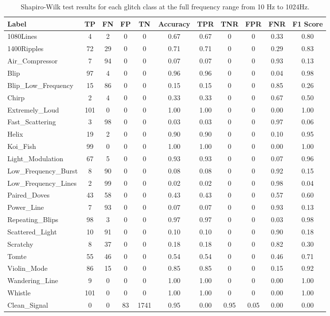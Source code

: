 \documentclass[12pt]{article}
\begin{document}
\begin{table}[H]
  \centering
  \begin{tabular}{lcccccccccc}
  \toprule
  Label & TP & FN & FP & TN & Accuracy & TPR & TNR & FPR & FNR & F1 Score \\
  \midrule
  1080Lines & 4 & 2 & 0 & 0 & 0.67 & 0.67 & 0 & 0 & 0.33 & 0.80 \\
  1400Ripples & 72 & 29 & 0 & 0 & 0.71 & 0.71 & 0 & 0 & 0.29 & 0.83 \\
  Air\_Compressor & 7 & 94 & 0 & 0 & 0.07 & 0.07 & 0 & 0 & 0.93 & 0.13 \\
  Blip & 97 & 4 & 0 & 0 & 0.96 & 0.96 & 0 & 0 & 0.04 & 0.98 \\
  Blip\_Low\_Frequency & 15 & 86 & 0 & 0 & 0.15 & 0.15 & 0 & 0 & 0.85 & 0.26 \\
  Chirp & 2 & 4 & 0 & 0 & 0.33 & 0.33 & 0 & 0 & 0.67 & 0.50 \\
  Extremely\_Loud & 101 & 0 & 0 & 0 & 1.00 & 1.00 & 0 & 0 & 0.00 & 1.00 \\
  Fast\_Scattering & 3 & 98 & 0 & 0 & 0.03 & 0.03 & 0 & 0 & 0.97 & 0.06 \\
  Helix & 19 & 2 & 0 & 0 & 0.90 & 0.90 & 0 & 0 & 0.10 & 0.95 \\
  Koi\_Fish & 99 & 0 & 0 & 0 & 1.00 & 1.00 & 0 & 0 & 0.00 & 1.00 \\
  Light\_Modulation & 67 & 5 & 0 & 0 & 0.93 & 0.93 & 0 & 0 & 0.07 & 0.96 \\
  Low\_Frequency\_Burst & 8 & 90 & 0 & 0 & 0.08 & 0.08 & 0 & 0 & 0.92 & 0.15 \\
  Low\_Frequency\_Lines & 2 & 99 & 0 & 0 & 0.02 & 0.02 & 0 & 0 & 0.98 & 0.04 \\
  Paired\_Doves & 43 & 58 & 0 & 0 & 0.43 & 0.43 & 0 & 0 & 0.57 & 0.60 \\
  Power\_Line & 7 & 93 & 0 & 0 & 0.07 & 0.07 & 0 & 0 & 0.93 & 0.13 \\
  Repeating\_Blips & 98 & 3 & 0 & 0 & 0.97 & 0.97 & 0 & 0 & 0.03 & 0.98 \\
  Scattered\_Light & 10 & 91 & 0 & 0 & 0.10 & 0.10 & 0 & 0 & 0.90 & 0.18 \\
  Scratchy & 8 & 37 & 0 & 0 & 0.18 & 0.18 & 0 & 0 & 0.82 & 0.30 \\
  Tomte & 55 & 46 & 0 & 0 & 0.54 & 0.54 & 0 & 0 & 0.46 & 0.71 \\
  Violin\_Mode & 86 & 15 & 0 & 0 & 0.85 & 0.85 & 0 & 0 & 0.15 & 0.92 \\
  Wandering\_Line & 9 & 0 & 0 & 0 & 1.00 & 1.00 & 0 & 0 & 0.00 & 1.00 \\
  Whistle & 101 & 0 & 0 & 0 & 1.00 & 1.00 & 0 & 0 & 0.00 & 1.00 \\
  Clean\_Signal & 0 & 0 & 83 & 1741 & 0.95 & 0.00 & 0.95 & 0.05 & 0.00 & 0.00 \\
  \bottomrule
  \end{tabular}
  \caption{Shapiro-Wilk test results for each glitch class at the full frequency range from 10 Hz to 1024Hz.}
  \label{tab:shapiro_full_range_results}
\end{table}
\end{document}
